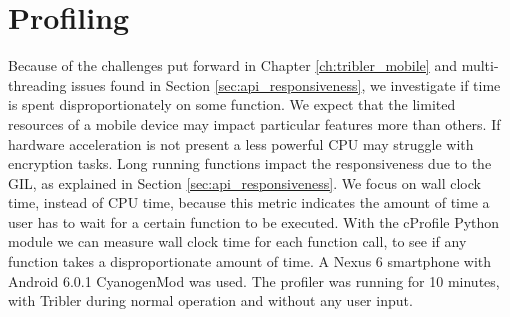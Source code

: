 \section{Profiling}\label{sec:profiling}
Because of the challenges put forward in Chapter \ref{ch:tribler_mobile} and multi-threading issues found in Section \ref{sec:api_responsiveness}, we investigate if time is spent disproportionately on some function.
We expect that the limited resources of a mobile device may impact particular features more than others.
If hardware acceleration is not present a less powerful CPU may struggle with encryption tasks.
Long running functions impact the responsiveness due to the GIL, as explained in Section \ref{sec:api_responsiveness}.
We focus on wall clock time, instead of CPU time, because this metric indicates the amount of time a user has to wait for a certain function to be executed.
With the cProfile Python module we can measure wall clock time for each function call, to see if any function takes a disproportionate amount of time.
A Nexus 6 smartphone with Android 6.0.1 CyanogenMod was used.
The profiler was running for 10 minutes, with Tribler during normal operation and without any user input.


